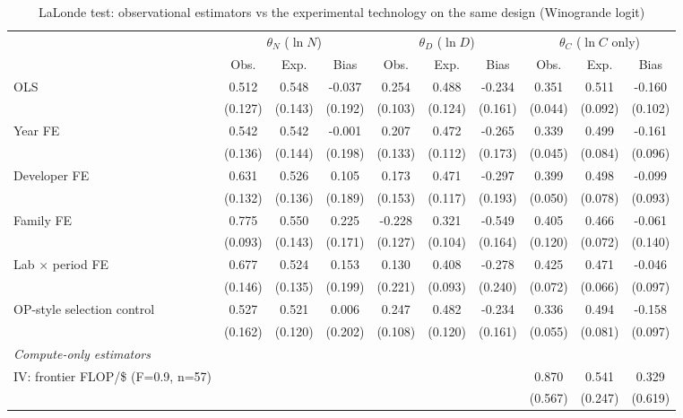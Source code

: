 \begin{table}[!htbp]
\centering
\scriptsize
\begin{threeparttable}
\caption{LaLonde test: observational estimators vs the experimental technology on the same design (Winogrande logit)}
\label{tab:table6_lalonde_wino}
\begin{tabular}{lccccccccc}
\toprule
\multicolumn{1}{c}{} & \multicolumn{3}{c}{$\theta_N$ ($\ln N$)} & \multicolumn{3}{c}{$\theta_D$ ($\ln D$)} & \multicolumn{3}{c}{$\theta_C$ ($\ln C$ only)} \\ \cmidrule(lr){2-4}\cmidrule(lr){5-7}\cmidrule(lr){8-10}
 & Obs. & Exp. & Bias & Obs. & Exp. & Bias & Obs. & Exp. & Bias \\
\midrule
OLS & 0.512 & 0.548 & -0.037 & 0.254 & 0.488 & -0.234 & 0.351 & 0.511 & -0.160 \\
 & (0.127) & (0.143) & (0.192) & (0.103) & (0.124) & (0.161) & (0.044) & (0.092) & (0.102) \\
Year FE & 0.542 & 0.542 & -0.001 & 0.207 & 0.472 & -0.265 & 0.339 & 0.499 & -0.161 \\
 & (0.136) & (0.144) & (0.198) & (0.133) & (0.112) & (0.173) & (0.045) & (0.084) & (0.096) \\
Developer FE & 0.631 & 0.526 & 0.105 & 0.173 & 0.471 & -0.297 & 0.399 & 0.498 & -0.099 \\
 & (0.132) & (0.136) & (0.189) & (0.153) & (0.117) & (0.193) & (0.050) & (0.078) & (0.093) \\
Family FE & 0.775 & 0.550 & 0.225 & -0.228 & 0.321 & -0.549 & 0.405 & 0.466 & -0.061 \\
 & (0.093) & (0.143) & (0.171) & (0.127) & (0.104) & (0.164) & (0.120) & (0.072) & (0.140) \\
Lab $\times$ period FE & 0.677 & 0.524 & 0.153 & 0.130 & 0.408 & -0.278 & 0.425 & 0.471 & -0.046 \\
 & (0.146) & (0.135) & (0.199) & (0.221) & (0.093) & (0.240) & (0.072) & (0.066) & (0.097) \\
OP-style selection control & 0.527 & 0.521 & 0.006 & 0.247 & 0.482 & -0.234 & 0.336 & 0.494 & -0.158 \\
 & (0.162) & (0.120) & (0.202) & (0.108) & (0.120) & (0.161) & (0.055) & (0.081) & (0.097) \\
\midrule
\multicolumn{10}{l}{\textit{Compute-only estimators}} \\
IV: frontier FLOP/\$ (F=0.9, n=57) &  &  &  &  &  &  & 0.870 & 0.541 & 0.329 \\
 &  &  &  &  &  &  & (0.567) & (0.247) & (0.619) \\

\end{tabular}
\end{threeparttable}
\end{table}
